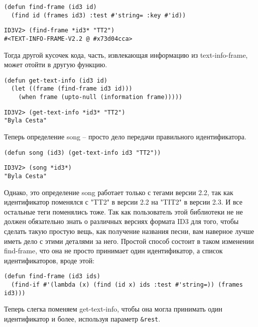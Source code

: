 \begin{lstlisting}
(defun find-frame (id3 id)
  (find id (frames id3) :test #'string= :key #'id))
\end{lstlisting}

\begin{lstlisting}
ID3V2> (find-frame *id3* "TT2")
#<TEXT-INFO-FRAME-V2.2 @ #x73d04cca>
\end{lstlisting}

Тогда другой кусочек кода, часть, извлекающая информацию из text-info-frame, может отойти
в другую функцию.

\begin{lstlisting}
(defun get-text-info (id3 id)
  (let ((frame (find-frame id3 id)))
    (when frame (upto-null (information frame)))))
\end{lstlisting}

\begin{lstlisting}
ID3V2> (get-text-info *id3* "TT2")
"Byla Cesta"
\end{lstlisting}

Теперь определение song -- просто дело передачи правильного идентификатора.

\begin{lstlisting}
(defun song (id3) (get-text-info id3 "TT2"))
\end{lstlisting}

\begin{lstlisting}
ID3V2> (song *id3*)
"Byla Cesta"
\end{lstlisting}

Однако, это определение song работает только с тегами версии 2.2, так как идентификатор
поменялся с "TT2" в версии 2.2 на "TIT2" в версии 2.3. И все остальные теги поменялись
тоже. Так как пользователь этой библиотеки не не должен обязательно знать о различных
версиях формата ID3 для того, чтобы сделать такую простую вещь, как получение названия
песни, вам наверное лучше иметь дело с этими деталями за него. Простой способ состоит в
таком изменении find-frame, что она не просто принимает один идентификатор, а список
идентификаторов, вроде этой:

\begin{lstlisting}
(defun find-frame (id3 ids)
  (find-if #'(lambda (x) (find (id x) ids :test #'string=)) (frames id3)))
\end{lstlisting}

Теперь слегка поменяем get-text-info, чтобы она могла принимать один идентификатор и
более, используя параметр \lstinline!&rest!.

